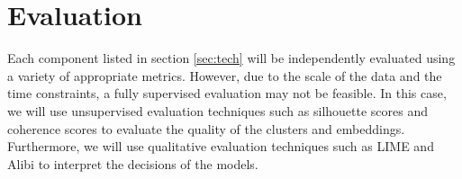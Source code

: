 \documentclass[letterpaper, twoside]{article}
\begin{document}
\section{Evaluation}
Each component listed in section \ref{sec:tech} will be independently evaluated using a variety of appropriate metrics. However, due to the scale of the data and the time constraints, a fully supervised evaluation may not be feasible. In this case, we will use unsupervised evaluation techniques such as silhouette scores and coherence scores to evaluate the quality of the clusters and embeddings. Furthermore, we will use qualitative evaluation techniques such as LIME \cite{lime} and Alibi \cite{alibi} to interpret the decisions of the models.
\newpage
\printbibliography
\end{document}
